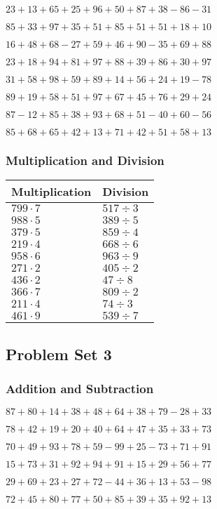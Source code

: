 \(23+13+65+25+96+50+87+38-86-31\)

\(85+33+97+35+51+85+51+51+18+10\)

\(16+48+68-27+59+46+90-35+69+88\)

\(23+18+94+81+97+88+39+86+30+97\)

\(31+58+98+59+89+14+56+24+19-78\)

\(89+19+58+51+97+67+45+76+29+24\)

\(87-12+85+38+93+68+51-40+60-56\)

\(85+68+65+42+13+71+42+51+58+13\)

\hypertarget{multiplication-and-division-1}{%
\subsubsection{Multiplication and
Division}\label{multiplication-and-division-1}}

\begin{longtable}[]{@{}ll@{}}
\toprule
Multiplication & Division\tabularnewline
\midrule
\endhead
\(799\cdot7\) & \(517÷3\)\tabularnewline
\(988\cdot5\) & \(389÷5\)\tabularnewline
\(379\cdot5\) & \(859÷4\)\tabularnewline
\(219\cdot4\) & \(668÷6\)\tabularnewline
\(958\cdot6\) & \(963÷9\)\tabularnewline
\(271\cdot2\) & \(405÷2\)\tabularnewline
\(436\cdot2\) & \(47÷8\)\tabularnewline
\(366\cdot7\) & \(809÷2\)\tabularnewline
\(211\cdot4\) & \(74÷3\)\tabularnewline
\(461\cdot9\) & \(539÷7\)\tabularnewline
\bottomrule
\end{longtable}

\hypertarget{problem-set-3}{%
\subsection{Problem Set 3}\label{problem-set-3}}

\hypertarget{addition-and-subtraction-2}{%
\subsubsection{Addition and
Subtraction}\label{addition-and-subtraction-2}}

\(87+80+14+38+48+64+38+79-28+33\)

\(78+42+19+20+40+64+47+35+33+73\)

\(70+49+93+78+59-99+25-73+71+91\)

\(15+73+31+92+94+91+15+29+56+77\)

\(29+69+23+27+72-44+36+13+53-98\)

\(72+45+80+77+50+85+39+35+92+13\)

